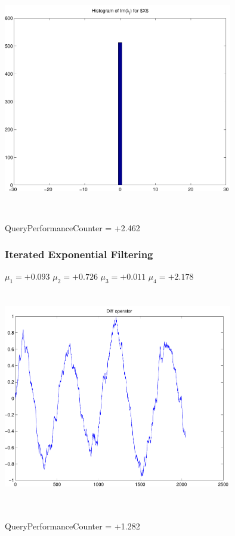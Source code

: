 \documentclass[9pt]{article}
\theoremstyle{plain}
\theoremstyle{definition}
\theoremstyle{remark}
\numberwithin{equation}{section}
\begin{document}
\includegraphics[width=10.0cm,height=10.0cm]{Im_lambda_n.pdf}

QueryPerformanceCounter  =  +2.462
\subsubsection{Iterated Exponential Filtering }
$\mu_1 =+0.093$
$\mu_2 =+0.726$
$\mu_3 =+0.011$
$\mu_4 =+2.178$
\includegraphics[width=10.0cm,height=10.0cm]{DIFF.pdf}

QueryPerformanceCounter  =  +1.282
\end{document}
